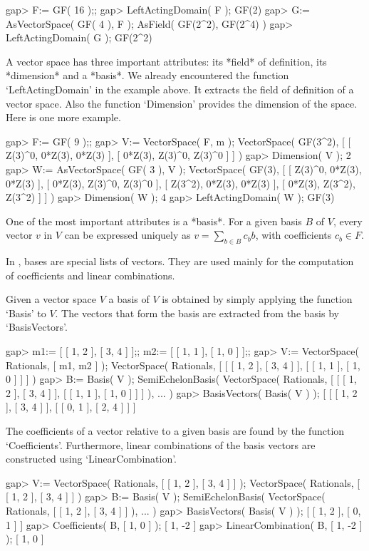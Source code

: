 \beginexample
    gap> F:= GF( 16 );;
    gap> LeftActingDomain( F );
    GF(2)
    gap> G:= AsVectorSpace( GF( 4 ), F );       
    AsField( GF(2^2), GF(2^4) )
    gap> LeftActingDomain( G );
    GF(2^2)
\endexample

A vector space has three important attributes: its *field* of definition,
its *dimension* and a *basis*. We already encountered the function 
`LeftActingDomain' in the example above. It extracts the field of definition
of a vector space. Also the function `Dimension' provides the dimension
of the space. Here is one more example.

\beginexample
    gap> F:= GF( 9 );;
    gap> V:= VectorSpace( F, m );
    VectorSpace( GF(3^2), 
    [ [ Z(3)^0, 0*Z(3), 0*Z(3) ], [ 0*Z(3), Z(3)^0, Z(3)^0 ] ] )
    gap> Dimension( V );
    2
    gap> W:= AsVectorSpace( GF( 3 ), V );
    VectorSpace( GF(3), [ [ Z(3)^0, 0*Z(3), 0*Z(3) ], [ 0*Z(3), Z(3)^0, Z(3)^0 ], 
    [ Z(3^2), 0*Z(3), 0*Z(3) ], [ 0*Z(3), Z(3^2), Z(3^2) ] ] )
    gap> Dimension( W );
    4
    gap> LeftActingDomain( W );
    GF(3)
\endexample

One of the most important attributes is a *basis*. For a given basis $B$ of 
$V$, every vector $v$ in $V$ can be expressed uniquely as 
$v = \sum_{b \in B} c_b b$, with coefficients $c_b \in F$.

In {\GAP}, bases are special lists of vectors.
They are used mainly for the computation of coefficients and linear
combinations. 

Given a vector space $V$ a basis of $V$ is obtained by
simply applying the function `Basis' to $V$. The vectors that form
the basis are extracted from the basis by `BasisVectors'. 

\beginexample
    gap> m1:= [ [ 1, 2 ], [ 3, 4 ] ];; m2:= [ [ 1, 1 ], [ 1, 0 ] ];;
    gap> V:= VectorSpace( Rationals, [ m1, m2 ] );
    VectorSpace( Rationals, [ [ [ 1, 2 ], [ 3, 4 ] ], [ [ 1, 1 ], [ 1, 0 ] ] ] )
    gap> B:= Basis( V );
    SemiEchelonBasis( VectorSpace( Rationals, 
    [ [ [ 1, 2 ], [ 3, 4 ] ], [ [ 1, 1 ], [ 1, 0 ] ] ] ), ... )
    gap> BasisVectors( Basis( V ) );
    [ [ [ 1, 2 ], [ 3, 4 ] ], [ [ 0, 1 ], [ 2, 4 ] ] ]
\endexample

The coefficients of 
a vector relative to a given basis are found by the function
`Coefficients'. Furthermore, linear combinations of the basis vectors
are constructed using `LinearCombination'.

\beginexample
    gap> V:= VectorSpace( Rationals, [ [ 1, 2 ], [ 3, 4 ] ] );
    VectorSpace( Rationals, [ [ 1, 2 ], [ 3, 4 ] ] )
    gap> B:= Basis( V );
    SemiEchelonBasis( VectorSpace( Rationals, [ [ 1, 2 ], [ 3, 4 ] ] ), ... )
    gap> BasisVectors( Basis( V ) );
    [ [ 1, 2 ], [ 0, 1 ] ]
    gap> Coefficients( B, [ 1, 0 ] );
    [ 1, -2 ]
    gap> LinearCombination( B, [ 1, -2 ] );
    [ 1, 0 ]
\endexample

